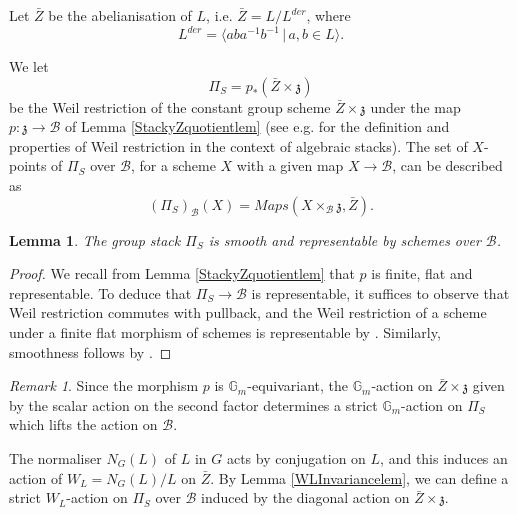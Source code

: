 \documentclass{amsart}
\newtheorem{lemma}[theorem]{Lemma}
\theoremstyle{remark}
\newtheorem{remark}[theorem]{Remark}
\numberwithin{theorem}{section}
\numberwithin{equation}{section}
\begin{document}
Let $\bar{Z}$ be the abelianisation of $L$, i.e. $\bar{Z} = L/L^{der}$, where
$$L^{der} = \langle aba^{-1}b^{-1} \,|\, a,b \in L \rangle.$$

We let
\begin{equation}\label{WeilRestrictioneqn}
    \Pi_S = p_*(\bar{Z} \times \mathfrak{z})
\end{equation}
be the Weil restriction of the constant group scheme $\bar{Z} \times \mathfrak{z}$ under the map $p:\mathfrak{z} \rightarrow \mathcal B$ of Lemma \ref{StackyZquotientlem} (see e.g. \cite{HR} for the definition and properties of Weil restriction in the context of algebraic stacks). The set of $X$-points of $\Pi_S$ over $\mathcal B$, for a scheme $X$ with a given map $X \rightarrow \mathcal B$, can be described as
\begin{equation}
    (\Pi_S)_{\mathcal B}(X) = Maps(X \times_{\mathcal B} \mathfrak{z}, \bar{Z}). 
\end{equation}

\begin{lemma}\label{WeilRestrictionlem}
    The group stack $\Pi_S$ is smooth and representable by schemes over $\mathcal B$.
\end{lemma}

\begin{proof} 
We recall from Lemma \ref{StackyZquotientlem} that $p$ is finite, flat and representable. To deduce that $\Pi_S \rightarrow \mathcal B$ is representable, it suffices to observe that Weil restriction commutes with pullback, and the Weil restriction of a scheme under a finite flat morphism of schemes is representable by \cite[Section 7.6, Theorem 4]{BLR}. Similarly, smoothness follows by \cite[Section 7.6, Proposition 5]{BLR}.
\end{proof}

\begin{remark}\label{WeilRestrictionrmk}
  Since the morphism $p$ is $\mathbb{G}_m$-equivariant, the $\mathbb{G}_m$-action on $\bar{Z}\times \mathfrak{z}$ given by the scalar action on the second factor determines a strict $\mathbb{G}_m$-action on $\Pi_S$ which lifts the action on $\mathcal B$. 
\end{remark}

The normaliser $N_G(L)$ of $L$ in $G$ acts by conjugation on $L$, and this induces an action of $W_L = N_G(L)/L$ on $\bar{Z}$. By Lemma \ref{WLInvariancelem}, we can define a strict $W_L$-action on $\Pi_S$ over $\mathcal B$ induced by the diagonal action on $\bar{Z} \times \mathfrak{z}$.
\end{document}

